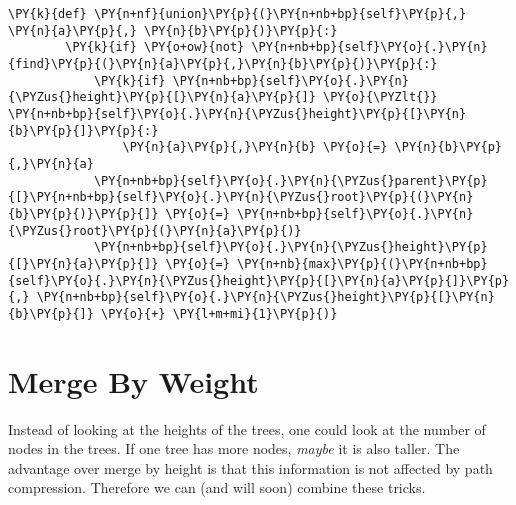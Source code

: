 \begin{Verbatim}[commandchars=\\\{\}]
    \PY{k}{def} \PY{n+nf}{union}\PY{p}{(}\PY{n+nb+bp}{self}\PY{p}{,} \PY{n}{a}\PY{p}{,} \PY{n}{b}\PY{p}{)}\PY{p}{:}
        \PY{k}{if} \PY{o+ow}{not} \PY{n+nb+bp}{self}\PY{o}{.}\PY{n}{find}\PY{p}{(}\PY{n}{a}\PY{p}{,}\PY{n}{b}\PY{p}{)}\PY{p}{:}
            \PY{k}{if} \PY{n+nb+bp}{self}\PY{o}{.}\PY{n}{\PYZus{}height}\PY{p}{[}\PY{n}{a}\PY{p}{]} \PY{o}{\PYZlt{}} \PY{n+nb+bp}{self}\PY{o}{.}\PY{n}{\PYZus{}height}\PY{p}{[}\PY{n}{b}\PY{p}{]}\PY{p}{:}
                \PY{n}{a}\PY{p}{,}\PY{n}{b} \PY{o}{=} \PY{n}{b}\PY{p}{,}\PY{n}{a}
            \PY{n+nb+bp}{self}\PY{o}{.}\PY{n}{\PYZus{}parent}\PY{p}{[}\PY{n+nb+bp}{self}\PY{o}{.}\PY{n}{\PYZus{}root}\PY{p}{(}\PY{n}{b}\PY{p}{)}\PY{p}{]} \PY{o}{=} \PY{n+nb+bp}{self}\PY{o}{.}\PY{n}{\PYZus{}root}\PY{p}{(}\PY{n}{a}\PY{p}{)}
            \PY{n+nb+bp}{self}\PY{o}{.}\PY{n}{\PYZus{}height}\PY{p}{[}\PY{n}{a}\PY{p}{]} \PY{o}{=} \PY{n+nb}{max}\PY{p}{(}\PY{n+nb+bp}{self}\PY{o}{.}\PY{n}{\PYZus{}height}\PY{p}{[}\PY{n}{a}\PY{p}{]}\PY{p}{,} \PY{n+nb+bp}{self}\PY{o}{.}\PY{n}{\PYZus{}height}\PY{p}{[}\PY{n}{b}\PY{p}{]} \PY{o}{+} \PY{l+m+mi}{1}\PY{p}{)}
\end{Verbatim}


\section{Merge By Weight}


Instead of looking at the heights of the trees, one could look at the number of nodes in the trees.  If one tree has more nodes, \emph{maybe} it is also taller.  The advantage over merge by height is that this information is not affected by path compression.  Therefore we can (and will soon) combine these tricks.


